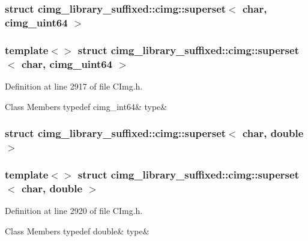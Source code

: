 \subsubsection{struct cimg\+\_\+library\+\_\+suffixed\+:\+:cimg\+:\+:superset$<$ char, cimg\+\_\+uint64 $>$}
\subsubsection*{template$<$$>$\newline
struct cimg\+\_\+library\+\_\+suffixed\+::cimg\+::superset$<$ char, cimg\+\_\+uint64 $>$}



Definition at line 2917 of file C\+Img.\+h.

\begin{DoxyFields}{Class Members}
\mbox{\label{namespacecimg__library__suffixed_1_1cimg_abccd536e281798c17710df88a7762274}} 
typedef cimg\_int64&
type&
\\
\hline

\end{DoxyFields}
\label{structcimg__library__suffixed_1_1cimg_1_1superset_3_01char_00_01double_01_4}
\subsubsection{struct cimg\+\_\+library\+\_\+suffixed\+:\+:cimg\+:\+:superset$<$ char, double $>$}
\subsubsection*{template$<$$>$\newline
struct cimg\+\_\+library\+\_\+suffixed\+::cimg\+::superset$<$ char, double $>$}



Definition at line 2920 of file C\+Img.\+h.

\begin{DoxyFields}{Class Members}
\mbox{\label{namespacecimg__library__suffixed_1_1cimg_a9d8f4d0c4c3dbf9f1afedae5b542929a}} 
typedef double&
type&
\\
\hline

\end{DoxyFields}
\label{structcimg__library__suffixed_1_1cimg_1_1superset_3_01char_00_01float_01_4}
